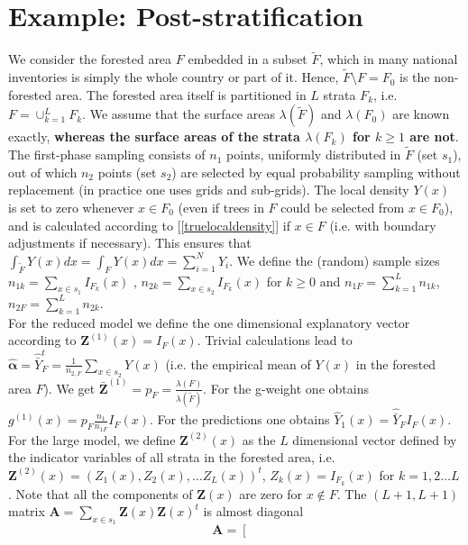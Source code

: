 \documentclass[a4paper,12pt,leqno, titlepage]{article}
\begin{document}
{{\section{Example: Post-stratification}\label{examples}

We consider the forested area $F$ embedded in a subset $\tilde{F}$, which in many national inventories is simply the whole country or part of it. Hence, $\tilde{F}\setminus F=F_0$ is the non-forested area. The forested area itself is partitioned in $L$ strata $F_k$, i.e. $F=\cup_{k=1}^L F_k$. We assume that the surface areas $\lambda(\tilde{F})$ and $\lambda(F_0)$ are known exactly, \textbf{whereas the surface areas of the strata $\lambda(F_k)$ for $k \ge 1$ are not}. The first-phase sampling consists of $n_1$ points, uniformly distributed in $\tilde{F}$ (set $s_1$), out of which $n_2$ points (set $s_2$) are selected by equal probability sampling without replacement (in practice one uses grids and sub-grids). The local density $Y(x)$ is set to zero whenever $x\in{F}_0$ (even if trees in $F$ could be selected from $x\in{F}_0$), and is calculated according to [\ref{truelocaldensity}] if $x\in{F}$ (i.e. with boundary adjustments if necessary). This ensures that $\int_{\tilde{F}}Y(x)dx=\int_{F}Y(x)dx=\sum_{i=1}^NY_i$. We define the (random) sample sizes $n_{1k}=\sum_{x\in{s}_1}I_{F_k}(x)$ ,
$n_{2k}=\sum_{x\in{s}_2}I_{F_k}(x)$ for $k\ge 0$ and $n_{1F}=\sum_{k=1}^Ln_{1k}$, $n_{2F}=\sum_{k=1}^L n_{2k}$.\\
For the reduced model we define the one dimensional explanatory vector according to $\pmb{Z}^{(1)}(x)=I_F(x)$. Trivial calculations lead to
$\hat{\pmb{\alpha}}=\hat{\bar{Y}}_F^t=\frac{1}{n_{2,F}}\sum_{x\in{s}_2}Y(x)$ (i.e. the empirical mean of $Y(x)$ in the forested area $F$). We get $\bar{\pmb{Z}}^{(1)}=p_F=\frac{\lambda(F)}{\lambda(\tilde{F})}$. For the g-weight one obtains
$g^{(1)}(x)=p_F\frac{n_1}{n_{1F}}I_F(x)$. For the predictions one obtains $\hat{Y}_1(x)=\hat{\bar{Y}}_FI_F(x)$. \\
For the large model, we define $\pmb{Z}^{(2)}(x)$ as the $L$ dimensional vector defined by the indicator variables of all strata in the forested area, i.e. $\pmb{Z}^{(2)}(x)=(Z_1(x),Z_2(x), \ldots Z_{L}(x))^t$, $Z_k(x)=I_{F_k}(x)$ for $k=1,2 \ldots L$. Note that all the components of $\pmb{Z}(x)$ are zero for $x\not\in{F}$. The $(L+1,L+1)$ matrix $\pmb{A}=\sum_{x\in{s}_1}\pmb{Z}(x)\pmb{Z}(x)^t$ is almost diagonal
\begin{equation*}
\pmb{A}= \left[ \begin {array}{cccccc}

\end{array}
\end{equation*}}}
\end{document}
